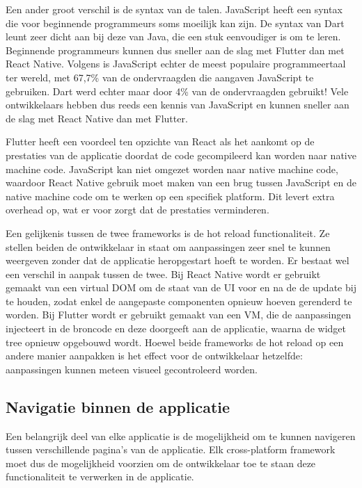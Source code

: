 Een ander groot verschil is de syntax van de talen. JavaScript heeft een syntax
die voor beginnende programmeurs soms moeilijk kan zijn. De syntax van Dart
leunt zeer dicht aan bij deze van Java, die een stuk eenvoudiger is om te leren.
Beginnende programmeurs kunnen dus sneller aan de slag met Flutter dan met React
Native. Volgens \textcite{Liu2020a} is JavaScript echter de meest populaire
programmeertaal ter wereld, met 67,7\% van de ondervraagden die aangaven
JavaScript te gebruiken. Dart werd echter maar door 4\% van de ondervraagden
gebruikt! Vele ontwikkelaars hebben dus reeds een kennis van JavaScript en
kunnen sneller aan de slag met React Native dan met Flutter.

Flutter heeft een voordeel ten opzichte van React als het aankomt op de
prestaties  van de applicatie doordat de code gecompileerd kan worden naar
native machine code. JavaScript kan niet omgezet worden naar native machine
code, waardoor React Native gebruik moet maken van een brug tussen JavaScript en
de native machine code om te werken op een specifiek platform. Dit levert extra
overhead op, wat er voor zorgt dat de prestaties verminderen. 

Een gelijkenis tussen de twee frameworks is de hot reload functionaliteit. Ze
stellen beiden de ontwikkelaar in staat om aanpassingen zeer snel te kunnen
weergeven zonder dat de applicatie heropgestart hoeft te worden. Er bestaat wel
een verschil in aanpak tussen de twee. Bij React Native wordt er gebruikt
gemaakt van een virtual DOM om de staat van de UI voor en na de de update bij te
houden, zodat enkel de aangepaste componenten opnieuw hoeven gerenderd te
worden. Bij Flutter wordt er gebruikt gemaakt van een VM, die de aanpassingen
injecteert in de broncode en deze doorgeeft aan de applicatie, waarna de widget
tree opnieuw opgebouwd wordt. Hoewel beide frameworks de hot reload op een
andere manier aanpakken is het effect voor de ontwikkelaar hetzelfde:
aanpassingen kunnen meteen visueel gecontroleerd worden.


\subsection{Navigatie binnen de applicatie}
\label{subsec:navigatieApplicatie}

Een belangrijk deel van elke applicatie is de mogelijkheid om te kunnen
navigeren tussen verschillende pagina's van de applicatie. Elk cross-platform
framework moet dus de mogelijkheid voorzien om de ontwikkelaar toe te staan deze
functionaliteit te verwerken in de applicatie.

